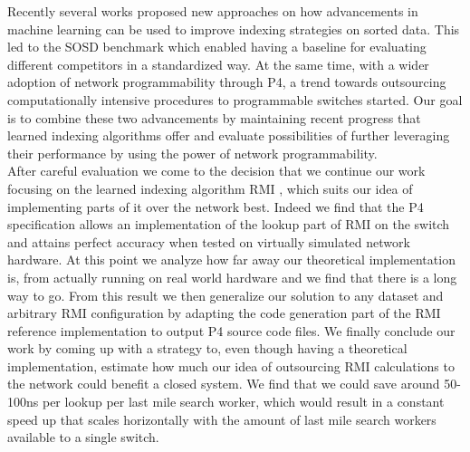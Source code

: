 Recently several works proposed new approaches on how advancements in machine learning can be used to improve indexing strategies on sorted data. This led to the SOSD benchmark \cite{sosd-vldb} which enabled having a baseline for evaluating different competitors in a standardized way. At the same time, with a wider adoption of network programmability through P4, a trend towards outsourcing computationally intensive procedures to programmable switches started. Our goal is to combine these two advancements by maintaining recent progress that learned indexing algorithms offer and evaluate possibilities of further leveraging their performance by using the power of network programmability.\\

After careful evaluation we come to the decision that we continue our work focusing on the learned indexing algorithm RMI \cite{rmi}, which suits our idea of implementing parts of it over the network best. Indeed we find that the P4 specification \cite{p4-spec} allows an implementation of the lookup part of RMI on the switch and attains perfect accuracy when tested on virtually simulated network hardware. At this point we analyze how far away our theoretical implementation is, from actually running on real world hardware and we find that there is a long way to go. From this result we then generalize our solution to any dataset and arbitrary RMI configuration by adapting the code generation part of the RMI reference implementation \cite{cdfshop} to output P4 source code files. We finally conclude our work by coming up with a strategy to, even though having a theoretical implementation, estimate how much our idea of outsourcing RMI calculations to the network could benefit a closed system. We find that we could save around 50-100ns per lookup per last mile search worker, which would result in a constant speed up that scales horizontally with the amount of last mile search workers available to a single switch.
